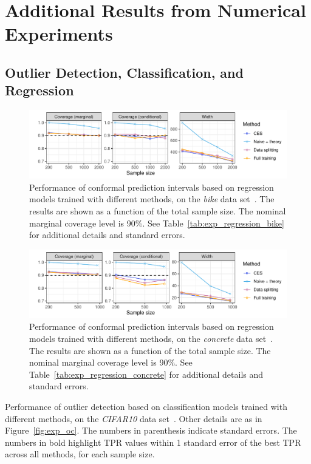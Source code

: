 \clearpage

\section{Additional Results from Numerical Experiments} \label{app:numerical-results}

\subsection{Outlier Detection, Classification, and Regression}

\begin{figure}[!htb]
    \centering
    \includegraphics[width=0.8\linewidth]{figures/exp_regression_bike.pdf}
    \caption{Performance of conformal prediction intervals based on regression models trained with different methods, on the {\em bike} data set~\cite{data-bike}. The results are shown as a function of the total sample size. The nominal marginal coverage level is 90\%. See Table~\ref{tab:exp_regression_bike} for additional details and standard errors.}
    \label{fig:exp_regression_bike}
\end{figure}

\begin{figure}[!htb]
    \centering
    \includegraphics[width=0.8\linewidth]{figures/exp_regression_concrete.pdf}
    \caption{Performance of conformal prediction intervals based on regression models trained with different methods, on the {\em concrete} data set~\cite{data-concrete}. The results are shown as a function of the total sample size. The nominal marginal coverage level is 90\%. See Table~\ref{tab:exp_regression_concrete} for additional details and standard errors.}
    \label{fig:exp_regression_concrete}
\end{figure}



\begin{table}[!htb]
\centering
    \caption{Performance of outlier detection based on classification models trained with different methods, on the {\em CIFAR10} data set~\cite{cifar10}. Other details are as in Figure~\ref{fig:exp_oc}. The numbers in parenthesis indicate standard errors. The numbers in bold highlight TPR values within 1 standard error of the best TPR across all methods, for each sample size.}
  \label{tab:exp_oc}
  
\end{table}

